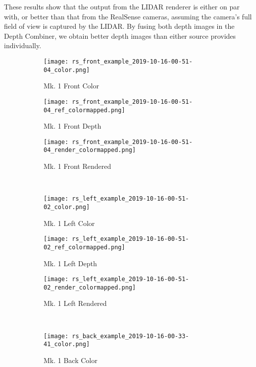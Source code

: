 These results show that the output from the LIDAR renderer is either on par with, or better than that from the RealSense cameras, assuming the camera's full field of view is captured by the LIDAR. By fusing both depth images in the Depth Combiner, we obtain better depth images than either source provides individually.

\begin{figure}
	\centering
	\begin{subfigure}{0.32\textwidth}
		\texttt{[image: rs\_front\_example\_2019-10-16-00-51-04\_color.png]}
		\caption{Mk. 1 Front Color}
		\label{lidar_front_color}
	\end{subfigure}		
	\hfill
	\begin{subfigure}{0.32\textwidth}
		\texttt{[image: rs\_front\_example\_2019-10-16-00-51-04\_ref\_colormapped.png]}
		\caption{Mk. 1 Front Depth}
		\label{lidar_front_ref}		
	\end{subfigure}
	\hfill
	\begin{subfigure}{0.32\textwidth}
		\texttt{[image: rs\_front\_example\_2019-10-16-00-51-04\_render\_colormapped.png]}
		\caption{Mk. 1 Front Rendered}
		\label{lidar_front_render}
	\end{subfigure}
	\\
	\begin{subfigure}{0.32\textwidth}
		\texttt{[image: rs\_left\_example\_2019-10-16-00-51-02\_color.png]}
		\caption{Mk. 1 Left Color}
		\label{lidar_left_color}
	\end{subfigure}		
	\hfill
	\begin{subfigure}{0.32\textwidth}
		\texttt{[image: rs\_left\_example\_2019-10-16-00-51-02\_ref\_colormapped.png]}
		\caption{Mk. 1 Left Depth}
		\label{lidar_left_ref}		
	\end{subfigure}
	\hfill
	\begin{subfigure}{0.32\textwidth}
		\texttt{[image: rs\_left\_example\_2019-10-16-00-51-02\_render\_colormapped.png]}
		\caption{Mk. 1 Left Rendered}
		\label{lidar_left_render}
	\end{subfigure}
	\\
	\begin{subfigure}{0.32\textwidth}
		\texttt{[image: rs\_back\_example\_2019-10-16-00-33-41\_color.png]}
		\caption{Mk. 1 Back Color}
		\label{lidar_back_color}
	\end{subfigure}		
	\hfill
	\begin{subfigure}{0.32\textwidth}

\end{subfigure}
\end{figure}
